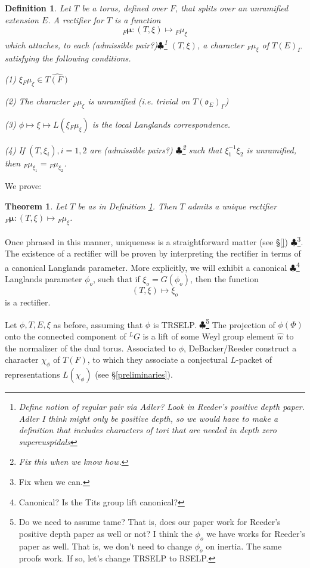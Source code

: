 \documentclass[11pt]{amsart}
\theoremstyle{plain}
\newtheorem{theorem}[enumi]{Theorem}
\newtheorem{definition}[enumi]{Definition}
\newcommand{\MAxxx}[1]{$\clubsuit$\footnote{#1}}
\begin{document}
\begin{definition}\label{rectifierdefinition}
Let $T$ be a torus, defined over $F$, that splits over an unramified extension $E$.  A \emph{rectifier} for $T$ is a function $${}_F \boldsymbol\mu : (T, \xi) \mapsto {}_F \mu_{\xi}$$
which attaches, to each (admissible pair?)\MAxxx{Define notion of regular pair via Adler?  Look in Reeder's positive depth paper.  Adler I think might only be positive depth, so we would have to make a definition that includes characters of tori that are needed in depth zero supercuspidals} $(T, \xi)$, a character ${}_F \mu_{\xi}$ of $T(E)_{\Gamma}$ satisfying the following conditions.

(1) $\xi {}_F \mu_{\xi} \in \widehat{T(F)}$

(2) The character ${}_F \mu_{\xi}$ is unramified (i.e. trivial on $T(\mathfrak{o}_E)_{\Gamma}$)

(3) $\phi \mapsto \xi \mapsto L(\xi {}_F \mu_{\xi})$ is the local Langlands correspondence.

(4) If $(T, \xi_i), i = 1,2$ are (admissible pairs?) \MAxxx{Fix this when we know how.} such that $\xi_1^{-1} \xi_2$ is unramified, then ${}_F \mu_{\xi_1} = {}_F \mu_{\xi_2}$.
\end{definition}

We prove:

\begin{theorem} Let $T$ be as in Definition \ref{rectifierdefinition}.  Then $T$ admits a unique rectifier ${}_F \boldsymbol\mu : (T, \xi) \mapsto {}_F \mu_{\xi}$.
\end{theorem}

Once phrased in this manner, uniqueness is a straightforward matter (see \S\ref{}) \MAxxx{Fix when we can.}.  The existence of a rectifier will be proven by interpreting the rectifier in terms of a canonical Langlands parameter.  More explicitly, we will exhibit a canonical \MAxxx{Canonical?  Is the Tits group lift canonical?} Langlands parameter $\phi_{o}$, such that if $\xi_o = G(\phi_o)$, then the function $$(T, \xi) \mapsto \xi_o$$ is a rectifier.

Let $\phi, T, E, \xi$ as before, assuming that $\phi$ is TRSELP. \MAxxx{Do we need to assume tame?  That is, does our paper work for Reeder's positive depth paper as well or not?  I think the $\phi_o$ we have works for Reeder's paper as well.  That is, we don't need to change $\phi_o$ on inertia. The same proofs work.  If so, let's change TRSELP to RSELP.}  The projection of $\phi(\Phi)$ onto the connected component of ${}^L G$ is a lift of some Weyl group element $\hat{w}$ to the normalizer of the dual torus.  Associated to $\phi$, DeBacker/Reeder construct a character $\chi_{\phi}$ of $T(F)$, to which they associate a conjectural $L$-packet of representations $L(\chi_{\phi})$ (see \S \ref{preliminaries}).
\end{document}
